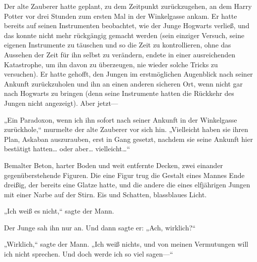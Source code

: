 Der alte Zauberer hatte geplant, zu dem Zeitpunkt zurückzugehen, an dem Harry Potter vor drei Stunden zum ersten Mal in der Winkelgasse ankam. Er hatte bereits auf seinen Instrumenten beobachtet, wie der Junge Hogwarts verließ, und das konnte nicht mehr rückgängig gemacht werden (sein einziger Versuch, seine eigenen Instrumente zu täuschen und so die Zeit zu kontrollieren, ohne das Aussehen der Zeit für ihn selbst zu verändern, endete in einer ausreichenden Katastrophe, um ihn davon zu überzeugen, nie wieder solche Tricks zu versuchen). Er hatte gehofft, den Jungen im erstmöglichen Augenblick nach seiner Ankunft zurückzuholen und ihn an einen anderen sicheren Ort, wenn nicht gar nach Hogwarts zu bringen (denn seine Instrumente hatten die Rückkehr des Jungen nicht angezeigt). Aber jetzt—

„Ein Paradoxon, wenn ich ihn sofort nach seiner Ankunft in der Winkelgasse zurückhole,“ murmelte der alte Zauberer vor sich hin. „Vielleicht haben sie ihren Plan, Askaban auszurauben, erst in Gang gesetzt, nachdem sie seine Ankunft hier bestätigt hatten… oder aber… vielleicht…“

\later

Bemalter Beton, harter Boden und weit entfernte Decken, zwei einander gegenüberstehende Figuren. Die eine Figur trug die Gestalt eines Mannes Ende dreißig, der bereits eine Glatze hatte, und die andere die eines elfjährigen Jungen mit einer Narbe auf der Stirn. Eis und Schatten, blassblaues Licht.

„Ich weiß es nicht,“ sagte der Mann.

Der Junge sah ihn nur an. Und dann sagte er: „Ach, wirklich?“

„Wirklich,“ sagte der Mann. „Ich weiß nichts, und von meinen Vermutungen will ich nicht sprechen. Und doch werde ich so viel sagen—“

